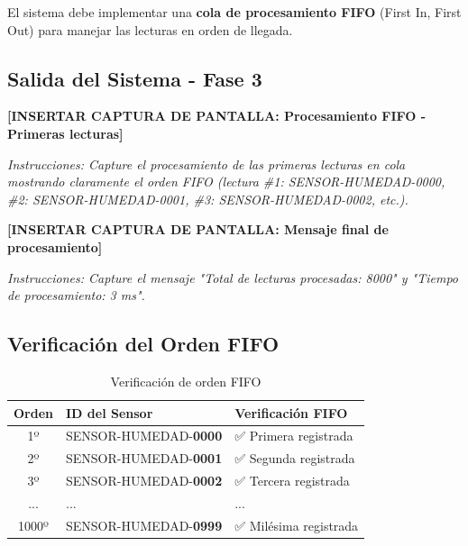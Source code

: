 \documentclass[12pt,a4paper]{article}
\begin{document}
\begin{tcolorbox}[colback=yellow!10,colframe=orange,title=\textbf{RF-003: Cola de Procesamiento}]
El sistema debe implementar una \textbf{cola de procesamiento FIFO} (First In, First Out) para manejar las lecturas en orden de llegada.
\end{tcolorbox}

\subsection{Salida del Sistema - Fase 3}

\begin{tcolorbox}[colback=green!5,colframe=green!75!black,title=\textbf{FASE 3: PROCESAMIENTO EN COLA (FIFO)}]
\vspace{0.5cm}
\textbf{[INSERTAR CAPTURA DE PANTALLA: Procesamiento FIFO - Primeras lecturas]}

\textit{Instrucciones: Capture el procesamiento de las primeras lecturas en cola mostrando claramente el orden FIFO (lectura \#1: SENSOR-HUMEDAD-0000, \#2: SENSOR-HUMEDAD-0001, \#3: SENSOR-HUMEDAD-0002, etc.).}
\vspace{1cm}

\textbf{[INSERTAR CAPTURA DE PANTALLA: Mensaje final de procesamiento]}

\textit{Instrucciones: Capture el mensaje "Total de lecturas procesadas: 8000" y "Tiempo de procesamiento: 3 ms".}
\vspace{0.5cm}
\end{tcolorbox}

\subsection{Verificación del Orden FIFO}

\begin{table}[h]
\centering
\begin{tabular}{|c|l|l|}
\hline
\rowcolor{evidenceblue!20}
\textbf{Orden} & \textbf{ID del Sensor} & \textbf{Verificación FIFO} \\
\hline
1º & SENSOR-HUMEDAD-\textbf{0000} & ✅ Primera registrada \\
2º & SENSOR-HUMEDAD-\textbf{0001} & ✅ Segunda registrada \\
3º & SENSOR-HUMEDAD-\textbf{0002} & ✅ Tercera registrada \\
... & ... & ... \\
1000º & SENSOR-HUMEDAD-\textbf{0999} & ✅ Milésima registrada \\
\hline
\end{tabular}
\caption{Verificación de orden FIFO}
\label{tab:fifo}
\end{table}
\end{document}
